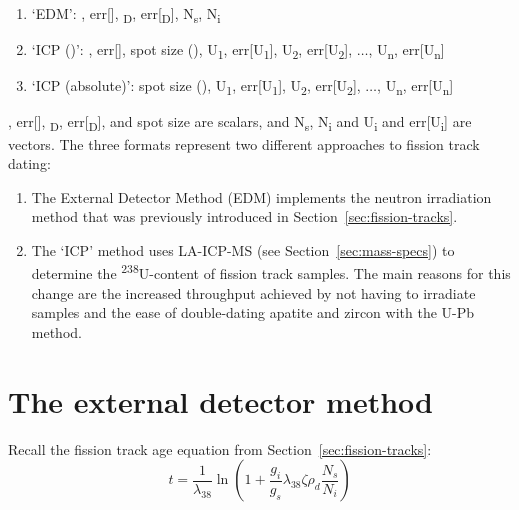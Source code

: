 \begin{refsection}
\begin{enumerate}
\item{`EDM':} \textzeta, err[\textzeta],
  \textrho\textsubscript{D}, err[\textrho\textsubscript{D}], 
  N\textsubscript{s}, N\textsubscript{i}
\item{`ICP (\textzeta)':} \textzeta, err[\textzeta], spot size
  (), U\textsubscript{1}, err[U\textsubscript{1}],
  U\textsubscript{2}, err[U\textsubscript{2}], $\ldots$,
  U\textsubscript{n}, err[U\textsubscript{n}]
\item{`ICP (absolute)':} spot size (), U\textsubscript{1},
  err[U\textsubscript{1}], U\textsubscript{2},
  err[U\textsubscript{2}], $\ldots$, U\textsubscript{n},
  err[U\textsubscript{n}]
\end{enumerate}

\noindent \textzeta, err[\textzeta], \textrho\textsubscript{D},
err[\textrho\textsubscript{D}], and spot size are scalars, and
N\textsubscript{s}, N\textsubscript{i} and U\textsubscript{i} and
err[U\textsubscript{i}] are vectors. The three formats represent two
different approaches to fission track dating:

\begin{enumerate}
\item The External Detector Method (EDM) implements the neutron
  irradiation method that was previously introduced in
  Section~\ref{sec:fission-tracks}.
\item The `ICP' method uses LA-ICP-MS (see
  Section~\ref{sec:mass-specs}) to determine the
  \textsuperscript{238}U-content of fission track samples.  The main
  reasons for this change are the increased throughput achieved by not
  having to irradiate samples and the ease of double-dating apatite
  and zircon with the U-Pb method.
\end{enumerate}

\section{The external detector method}
\label{sec:EDM}

Recall the fission track age equation from
Section~\ref{sec:fission-tracks}:
\begin{equation}
t =
\frac{1}{\lambda_{38}}\ln\left(1+\frac{g_i}{g_s}
\lambda_{38}\zeta\rho_d\frac{N_s}{N_i}\right)
\label{eq:tzeta2}
\end{equation}


\end{refsection}
